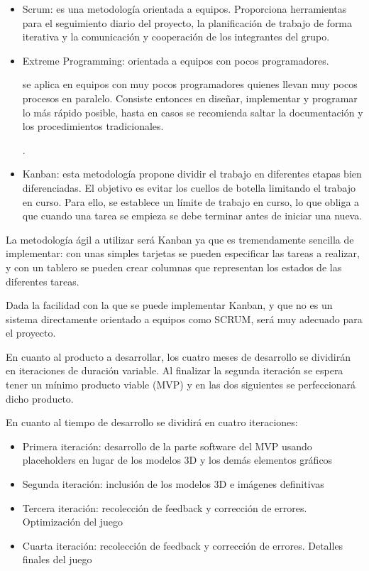 \begin{itemize}
	\item Scrum: es una metodología orientada a equipos. Proporciona herramientas para el seguimiento diario del proyecto, la planificación de trabajo de forma iterativa y la comunicación y cooperación de los integrantes del grupo.
	\item Extreme Programming: orientada a equipos con pocos programadores. 
		\begin{itquote}
			se aplica en equipos con muy pocos programadores quienes llevan muy pocos procesos en paralelo. Consiste entonces en diseñar, implementar y programar lo más rápido posible, hasta en casos se recomienda saltar la documentación y los procedimientos tradicionales.
			\begin{flushright}
	 			\cite{opheliapastrana2015}.
 			\end{flushright}
		\end{itquote}
	\item Kanban: esta metodología propone dividir el trabajo en diferentes etapas bien diferenciadas. El objetivo es evitar los cuellos de botella limitando el trabajo en curso. Para ello, se establece un límite de trabajo en curso, lo que obliga a que cuando una tarea se empieza se debe terminar antes de iniciar una nueva.
\end{itemize}

La metodología ágil a utilizar será Kanban ya que es tremendamente sencilla de implementar: con unas simples tarjetas se pueden especificar las tareas a realizar, y con un tablero se pueden crear columnas que representan los estados de las diferentes tareas.

Dada la facilidad con la que se puede implementar Kanban, y que no es un sistema directamente orientado a equipos como SCRUM, será muy adecuado para el proyecto.


En cuanto al producto a desarrollar, los cuatro meses de desarrollo se dividirán en iteraciones de duración variable. Al finalizar la segunda iteración se espera tener un mínimo producto viable (MVP) y en las dos siguientes se perfeccionará dicho producto.

En cuanto al tiempo de desarrollo se dividirá en cuatro iteraciones: 

\begin{itemize}
	\item Primera iteración: desarrollo de la parte software del MVP usando placeholders en lugar de los modelos 3D y los demás elementos gráficos
	\item Segunda iteración: inclusión de los modelos 3D e imágenes definitivas
	\item Tercera iteración: recolección de feedback y corrección de errores. Optimización del juego
	\item Cuarta iteración: recolección de feedback y corrección de errores. Detalles finales del juego
\end{itemize}

